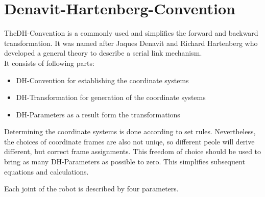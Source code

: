 \section{Denavit-Hartenberg-Convention}

The\ac{DH}-Convention is a commonly used and simplifies the forward and backward transformation. It was named after Jaques Denavit and Richard Hartenberg who developed a general theory to describe a serial link mechanism. \cite{DenavitHartenbergLesson}\\
It consists of following parts:

\begin{itemize}[leftmargin=3cm]
	\item \ac{DH}-Convention for establishing the coordinate systems
	\item \ac{DH}-Transformation for generation of the coordinate systems
	\item \ac{DH}-Parameters as a result form the transformations
\end{itemize}

Determining the coordinate systems is done according to set rules. Nevertheless, the choices of coordinate frames are also not uniqe, so different peole will derive different, but correct frame assignments. This freedom of choice should be used to bring as many \ac{DH}-Parameters as possible to zero. This simplifies subsequent equations and calculations. \cite{DenavitHartenbergKonventionen}

Each joint of the robot is described by four parameters.